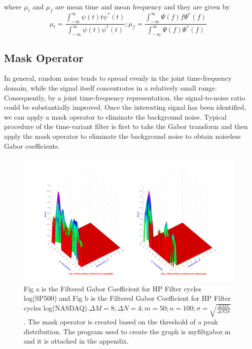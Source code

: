 where $\mu_t$ and $\mu_f$ are mean time and mean frequency and they are given by
\begin{equation*}
\mu_t = \frac{\int_{-\infty}^{\infty}{\psi(t)t\psi ^*(t)}}{\int_{-\infty}^{\infty}{\psi(t)\psi ^*(t)}} ;
\mu_f = \frac{\int_{-\infty}^{\infty}{\Psi(f)f\Psi ^*(f)}}{\int_{-\infty}^{\infty}{\Psi(f)\Psi ^*(f)}}
\end{equation*}

\subsection{Mask Operator}
In general, random noise tends to spread evenly in the joint time-frequency domain, while the signal itself concentrates in a relatively small range. Consequently, by a joint time-frequency representation, the signal-to-noise ratio could be substantially improved. Once the interesting signal has been identified, we can apply a mask operator to eliminate the background noise. Typical procedure of the time-variant filter is first to take the Gabor transform and then apply the mask operator to eliminate the background noise to obtain noiseless Gabor coefficients. 

\begin{figure}[!ht]
\includegraphics[scale=.15]{Images/GaborMasked50}
\caption{Fig a is the Filtered Gabor Coefficient for HP Filter cycles log(SP500) and Fig b is the Filtered Gabor Coefficient for HP Filter cycles log(NASDAQ).$\Delta M = 8; \Delta N = 4; m = 50; n = 100; \sigma = \sqrt{\frac{\Delta M L}{\Delta N 2\pi}}$. The mask operator is created based on the threshold of a peak distribution. The program used to create the graph is myfiltgabor.m and it is attached in the appendix.}
\label{fig:GaborMasked50}
\end{figure}

